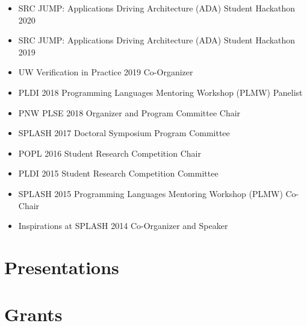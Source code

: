 \documentclass[10pt]{article}
\begin{document}
\begin{itemize}
  \item SRC JUMP: Applications Driving Architecture (ADA) Student Hackathon 2020
  \item SRC JUMP: Applications Driving Architecture (ADA) Student Hackathon 2019
  \item UW Verification in Practice 2019 Co-Organizer
  \item PLDI 2018 Programming Languages Mentoring Workshop (PLMW) Panelist
  \item PNW PLSE 2018 Organizer and Program Committee Chair
  \item SPLASH 2017 Doctoral Symposium Program Committee
  \item POPL 2016 Student Research Competition Chair
  \item PLDI 2015 Student Research Competition Committee
  \item SPLASH 2015 Programming Languages Mentoring Workshop (PLMW) Co-Chair
  \item Inspirations at SPLASH 2014 Co-Organizer and Speaker
\end{itemize}

\section*{Presentations}

\section*{Grants}
\end{document}
